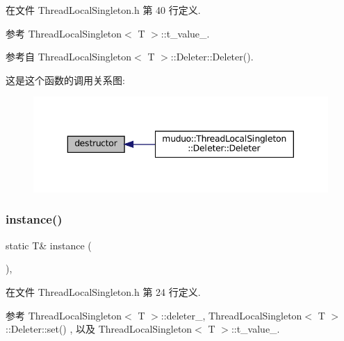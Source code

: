 在文件 Thread\+Local\+Singleton.\+h 第 40 行定义.



参考 Thread\+Local\+Singleton$<$ T $>$\+::t\+\_\+value\+\_\+.



参考自 Thread\+Local\+Singleton$<$ T $>$\+::\+Deleter\+::\+Deleter().

这是这个函数的调用关系图\+:
\nopagebreak
\begin{figure}[H]
\begin{center}
\leavevmode
\includegraphics[width=343pt]{classmuduo_1_1ThreadLocalSingleton_a5506686777ddc14d0643f2358ed9f44e_icgraph}
\end{center}
\end{figure}
\mbox{\label{classmuduo_1_1ThreadLocalSingleton_a359703743cd890f1e3df60b6b06a5724}} 
\subsubsection{\texorpdfstring{instance()}{instance()}}
{\footnotesize\ttfamily static T\& instance (\begin{DoxyParamCaption}{ }\end{DoxyParamCaption})\hspace{0.3cm}{\ttfamily [inline]}, {\ttfamily [static]}}



在文件 Thread\+Local\+Singleton.\+h 第 24 行定义.



参考 Thread\+Local\+Singleton$<$ T $>$\+::deleter\+\_\+, Thread\+Local\+Singleton$<$ T $>$\+::\+Deleter\+::set() , 以及 Thread\+Local\+Singleton$<$ T $>$\+::t\+\_\+value\+\_\+.

